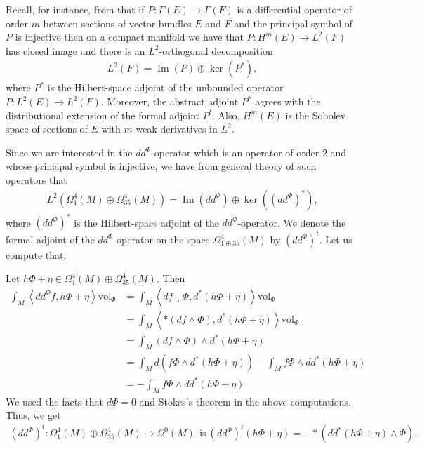 \documentclass[10pt,a4paper,reqno]{article}
\theoremstyle{definition}
\numberwithin{equation}{section}
\newcommand{\vol}{\mathrm{vol}}
\def\ddphi{dd^{\Phi}}
\DeclareMathOperator{\Ima}{Im}
\begin{document}
Recall, for instance, from \cite[Appendix]{pacini-raferro-pluripotential} that if $P:\Gamma(E)\rightarrow \Gamma(F)$ is a differential operator of order $m$ between sections of vector bundles $E$ and $F$ and the principal symbol of $P$ is injective then on a compact manifold we have that $P:H^m(E)\rightarrow L^2(F)$ has closed image and there is an $L^2$-orthogonal decomposition
\begin{align*}
L^2(F) = \Ima(P)\oplus \ker (P^*),
\end{align*}
where $P^*$ is the Hilbert-space adjoint of the unbounded operator $P: L^2(E)\rightarrow L^2(F)$. Moreover, the abstract adjoint $P^*$ agrees with the distributional extension of the formal adjoint $P^t$. Also, $H^m(E)$ is the Sobolev space of sections of $E$ with $m$ weak derivatives in $L^2$.

Since we are interested in the $\ddphi$-operator which is an operator of order $2$ and whose principal symbol is injective, we have from general theory of such operators that
\begin{align*}
L^2(\Omega^4_1(M)\oplus \Omega^4_{35}(M))= \Ima(\ddphi) \oplus \ker ((\ddphi)^*),
\end{align*}
where $(\ddphi)^*$ is the Hilbert-space adjoint of the $\ddphi$-operator. We denote the formal adjoint of the $\ddphi$-operator on the space $\Omega^4_{1\oplus 35}(M)$ by $(\ddphi)^t$. Let us compute that.

Let $h\Phi+\eta \in \Omega^4_1(M)\oplus \Omega^4_{35}(M)$. Then
\begin{align*}
\int_M \left\langle \ddphi f, h\Phi + \eta  \right\rangle \vol_{\Phi}&=\int_M \left\langle df\lrcorner \Phi, d^*(h\Phi+\eta)  \right\rangle \vol_{\Phi}\\
&= \int_M \left\langle *(df\wedge \Phi), d^*(h\Phi +\eta) \right\rangle \vol_{\Phi}\\
&=\int_M  (df\wedge \Phi) \wedge d^*(h\Phi+\eta)  \\
&=\int_M d(f\Phi\wedge d^*(h\Phi+\eta))-\int_M f\Phi \wedge dd^*(h\Phi+\eta)\\
&=-\int_M f\Phi \wedge dd^*(h\Phi+\eta).
\end{align*}
We used the facts that $d\Phi=0$ and Stokes's theorem in the above computations. Thus, we get
\begin{align}\label{ddphiadjoint}
(\ddphi)^t: \Omega^4_1(M)\oplus \Omega^4_{35}(M)\rightarrow \Omega^0(M)\ \ \text{is}\ (\ddphi)^t(h\Phi+\eta) = -*(dd^*(h\Phi+\eta)\wedge \Phi).
\end{align}
\end{document}
